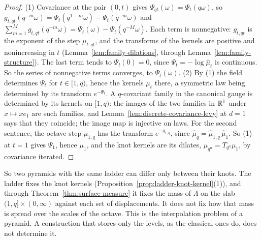 \begin{proof}
\leanok
{}
(1) Covariance at the pair $(0, t)$ gives $\Psi_{qt}(\omega) = \Psi_t(q\omega)$, so
$g_{t,qt}(q^{-m}\omega) = \Psi_t(q^{1-m}\omega) - \Psi_t(q^{-m}\omega)$ and
$\sum_{m=1}^{M}g_{t,qt}(q^{-m}\omega) = \Psi_t(\omega) - \Psi_t(q^{-M}\omega)$. Each term is
nonnegative: $g_{t,qt}$ is the exponent of the step $\mu_{t,qt}$, and the transforms of the kernels
are positive and nonincreasing in $t$ (Lemma~\ref{lem:family-dilations}, through
Lemma~\ref{lem:family-structure}). The last term tends to $\Psi_t(0) = 0$, since
$\Psi_t = -\log\widehat\mu_t$ is continuous. So the series of nonnegative terms converges, to
$\Psi_t(\omega)$.
(2) By (1) the field determines $\Psi_t$ for $t \in [1,q)$, hence the kernels $\mu_t$ there, a
symmetric law being determined by its transform $e^{-\Psi_t}$. A $q$-covariant family in the
canonical gauge is determined by its kernels on $[1, q)$: the images of the two families in $\mathbb{R}^1$
under $x \mapsto xe_1$ are such families, and Lemma~\ref{lem:discrete-covariance-levy} at $d = 1$
says that they coincide; the image map is injective on laws. For the second sentence, the
octave step $\mu_{1,q}$ has the transform $e^{-g_{1,q}}$, since $\widehat\mu_q = \widehat\mu_{1,q}\,
\widehat\mu_1$. So (1) at $t = 1$ gives $\Psi_1$, hence $\mu_1$, and the knot kernels are its dilates,
$\mu_{q^n} = T_{q^n}\mu_1$, by covariance iterated.
\end{proof}

So two pyramids with the same ladder can differ only between their knots. The ladder fixes the
knot kernels (Proposition~\ref{prop:ladder-knot-kernel}(1)), and through
Theorem~\ref{thm:surface-measure} it fixes the mass of $\Lambda$ on the slab
$(1,q] \times (0,\infty)$ against each set of displacements. It does not fix how that mass is spread
over the scales of the octave. This is the interpolation problem of a pyramid. A construction that
stores only the levels, as the classical ones do, does not determine it.

